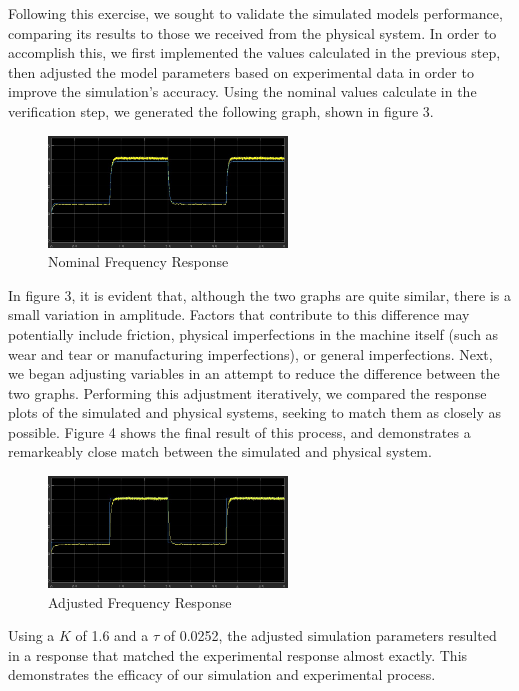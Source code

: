 \documentclass[conference,compsoc]{IEEEtran}
\begin{document}
  Following this exercise, we sought to validate the simulated models performance, comparing its results to those we received from the physical system. In order to accomplish this, we first implemented the values calculated in the previous step, then adjusted the model parameters based on experimental data in order to improve the simulation's accuracy. Using the nominal values calculate in the verification step, we generated the following graph, shown in figure 3.
  \begin{figure}[!t]
    \centering
    \includegraphics[width=2.5in]{NominalFrequencyResponse.jpg}
    \caption{Nominal Frequency Response}
    \label{fig_sim}
  \end{figure}
  In figure 3, it is evident that, although the two graphs are quite similar, there is a small variation in amplitude. Factors that contribute to this difference may potentially include friction, physical imperfections in the machine itself (such as wear and tear or manufacturing imperfections), or general imperfections.
  Next, we began adjusting variables in an attempt to reduce the difference between the two graphs. Performing this adjustment iteratively, we compared the response plots of the simulated and physical systems, seeking to match them as closely as possible. Figure 4 shows the final result of this process, and demonstrates a remarkeably close match between the simulated and physical system.
  \begin{figure}[!t]
    \centering
    \includegraphics[width=2.5in]{AdjustedFrequencyResponse.jpg}
    \caption{Adjusted Frequency Response}
    \label{fig_sim}
  \end{figure}
  Using a $K$ of 1.6 and a $\tau$ of 0.0252, the adjusted simulation parameters resulted in a response that matched the experimental response almost exactly. This demonstrates the efficacy of our simulation and experimental process.
\end{document}
